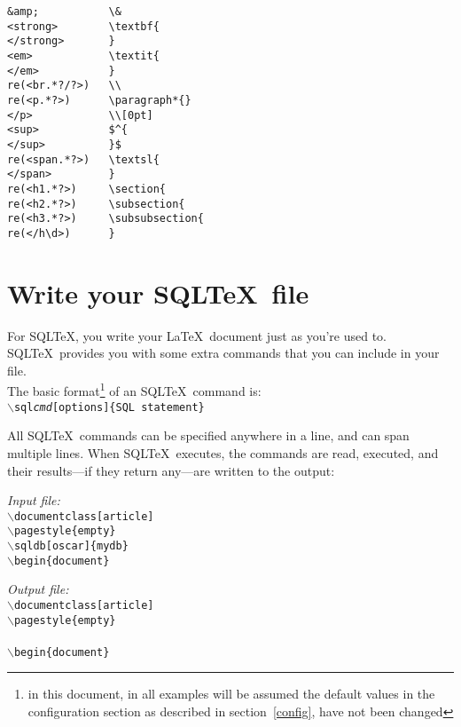 \documentclass{article}
\newcommand{\bs}{\ensuremath{\backslash}}
\newcommand{\vs}{\vspace{3mm}}
\begin{document}
\noindent\begin{verbatim}
&amp;           \&
<strong>        \textbf{
</strong>       }
<em>            \textit{
</em>           }
re(<br.*?/?>)   \\
re(<p.*?>)      \paragraph*{}
</p>            \\[0pt]
<sup>           $^{
</sup>          }$
re(<span.*?>)   \textsl{
</span>         }
re(<h1.*?>)     \section{
re(<h2.*?>)     \subsection{
re(<h3.*?>)     \subsubsection{
re(</h\d>)      }
\end{verbatim}

\section{Write your SQL\TeX\ file}

For SQL\TeX, you write your \LaTeX\ document just as you're used to. SQL\TeX\ provides you with
some extra commands that you can include in your file.\\
The basic format\footnote{in this document, in all examples will be assumed the default values in the
configuration section as described in section~\ref{config}, have not been changed} of an SQL\TeX\ command is: \\
\texttt{\bs sql\emph{cmd}[options]\{SQL statement\}}

\vs

All SQL\TeX\ commands can be specified anywhere in a line, and can span multiple lines.
When SQL\TeX\ executes, the commands are read, executed, and their results---if they return
any---are written to the output:

\vs

\begin{minipage}[t]{0.5\textwidth}\textsl{Input file:}\\\texttt{\footnotesize{\bs documentclass[article] \\
\bs pagestyle\{empty\} \\
\bs sqldb[oscar]\{mydb\} \\
\bs begin\{document\} \\
}}\end{minipage}\hfill\begin{minipage}[t]{0.5\textwidth}\textsl{Output file:}\\\texttt{\footnotesize{\bs documentclass[article] \\
\bs pagestyle\{empty\} \\
 \\
\bs begin\{document\} \\
}}\end{minipage}
\end{document}
